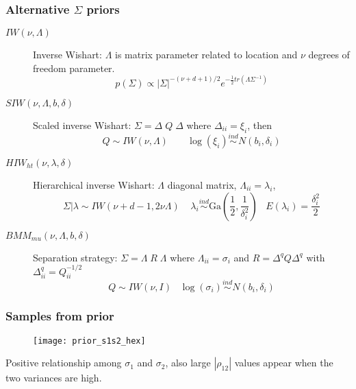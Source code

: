\documentclass[9pt]{beamer}\usepackage[]{graphicx}\usepackage[]{color}
\begin{document}
\begin{frame}
\frametitle{ Alternative $\Sigma$ priors}

\begin{description}
\item[$IW(\nu, \Lambda)$] Inverse Wishart:  $\Lambda$ is matrix parameter related to location and $\nu$ degrees of freedom parameter.    \[  p(\Sigma) \propto  |\Sigma|^{-(\nu+ d +1)/2 } e^{-\frac{1}{2} tr( \Lambda \Sigma^{-1}) } \]
\pause

\item[$SIW(\nu, \Lambda, b, \delta)$] Scaled inverse Wishart: $\Sigma = \Delta \; Q \; \Delta$ where $ \Delta_{ii} =\xi_i$, then \[Q \sim IW(\nu, \Lambda) \;\;\;\;\;\;\; \log(\xi_i) \stackrel{ind} \sim N(b_i, \delta_i) \]
\pause

\item[$HIW_{ht}(\nu, \lambda, \delta)$] Hierarchical inverse Wishart:  $\Lambda$ diagonal matrix, $\Lambda_{ii} = \lambda_i$,   \[\Sigma\vert\lambda \sim IW( \nu + d - 1 ,  2\nu\Lambda)  \;\;\;\; \lambda_i \stackrel{ind} \sim \mbox{Ga}\left(\frac{1}{2} , \frac{1}{\delta_i^2}\right) \;\;\; E(\lambda_i)=\frac{\delta_i^2}{2} \]  
\pause

\item[$ BMM_{mu}(\nu, \Lambda, b, \delta)$] Separation strategy: $\Sigma = \Lambda \; R \; \Lambda$  where $\Lambda_{ii}=\sigma_{i}$ and $R=\Delta^q Q \Delta^q$ with $\Delta^q_{ii} = Q_{ii}^{-1/2}$ \[  Q \sim IW(\nu, I )  \;\;\; \log(\sigma_i) \stackrel{ind} \sim N(b_i, \delta_i) \]
\end{description}
\end{frame}

\begin{frame}
\frametitle{ Samples from prior }

\begin{figure}[htbp]
\begin{center}
 \texttt{[image: prior\_s1s2\_hex]} 
\end{center}
\end{figure}

Positive relationship among $\sigma_1$ and $\sigma_2$, also large $|\rho_{12}|$ values appear when the two variances are high.
\end{frame}
\end{document}
